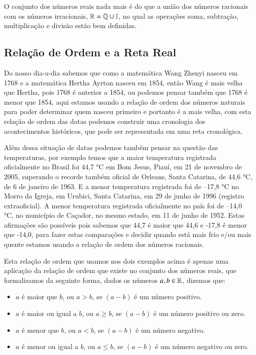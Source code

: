 O conjunto dos números reais nada mais é do que a união dos números racionais com os números irracionais, $\mathbb{R}= \mathbb{Q} \cup \mathbb{I}$, no qual as operações soma, subtração, multiplicação e divisão estão bem definidas.

\subsection{Relação de Ordem e a Reta Real}

Do nosso dia-a-dia sabemos que como a matemática Wang Zhenyi nasceu em 1768 e a matemática Hertha Ayrton nasceu em 1854, então Wang é mais velha que Hertha, pois 1768 é anterior a 1854, ou podemos pensar também que 1768 é  menor que 1854, aqui estamos usando a relação de ordem dos números naturais para poder determinar quem nasceu primeiro e portanto é a mais velha, com esta relação de ordem das datas podemos construir uma cronologia dos acontecimentos históricos, que pode ser representada em uma reta cronológica. 

Além dessa situação de datas podemos também pensar na questão das temperaturas, por exemplo temos que a maior temperatura registrada oficialmente no Brasil foi 44,7 °C em Bom Jesus, Piauí, em 21 de novembro de 2005, superando o recorde também oficial de Orleans, Santa Catarina, de 44,6 °C, de 6 de janeiro de 1963. E a menor temperatura registrada foi de –17,8 °C no Morro da Igreja, em Urubici, Santa Catarina, em 29 de junho de 1996 (registro extraoficial). A menor temperatura registrada oficialmente no país foi de –14,0 °C, no município de Caçador, no mesmo estado, em 11 de junho de 1952. Estas afirmações são possíveis pois sabemos que 44,7 é maior que 44,6 e -17,8 é menor que -14,0, para fazer estas comparações e decidir quando está mais frio e/ou mais quente estamos usando a relação de ordem dos números racionais.

Esta relação de ordem que usamos nos dois exemplos acima é apenas uma aplicação da relação de ordem que existe no conjunto dos números reais, que formalizamos da seguinte forma, dados os números $a, b \in \mathbb{R}$, dizemos que:

\begin{itemize}
\item $a$ é maior que $b$, ou $a > b$, se $(a - b)$ é um número positivo.
\item $a$ é maior ou igual a $b$, ou $a \geq b$, se $(a - b)$ é um número positivo ou zero.
\item $a$ é menor que $b$, ou $a < b$, se $(a - b)$ é um número negativo.
\item $a$ é menor ou igual a $b$, ou $a \leq b$, se $(a - b)$ é um número negativo ou zero.
\end{itemize}

